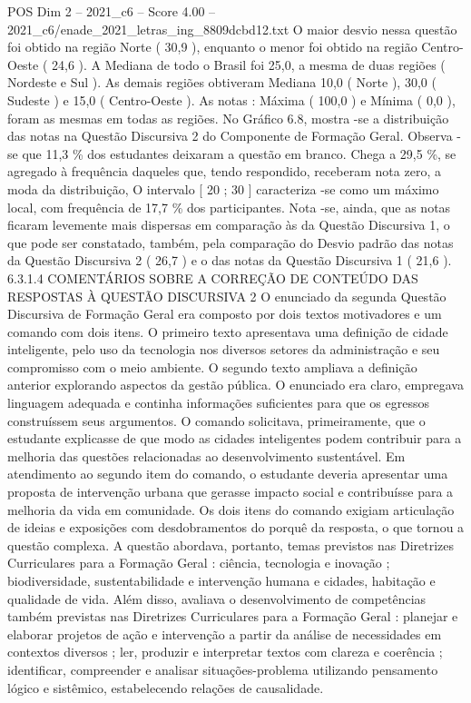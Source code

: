 \begin{textsample}{POS Dim 2 – 2021\_c6 – Score 4.00 – 2021\_c6/enade\_2021\_letras\_ing\_8809dcbd12.txt}
O maior desvio nessa questão foi obtido na região Norte ( 30,9 ), enquanto o menor foi obtido na região Centro-Oeste ( 24,6 ).
A Mediana de todo o Brasil foi 25,0, a mesma de duas regiões ( Nordeste e Sul ).
As demais regiões obtiveram Mediana 10,0 ( Norte ), 30,0 ( Sudeste ) e 15,0 ( Centro-Oeste ).
As notas : Máxima ( 100,0 ) e Mínima ( 0,0 ), foram as mesmas em todas as regiões.
No Gráfico 6.8, mostra -se a distribuição das notas na Questão Discursiva 2 do Componente de Formação Geral.
Observa -se que 11,3 \% dos estudantes deixaram a questão em branco.
Chega a 29,5 \%, se agregado à frequência daqueles que, tendo respondido, receberam nota zero, a moda da distribuição, O intervalo [ 20 ; 30 ] caracteriza -se como um máximo local, com frequência de 17,7 \% dos participantes.
Nota -se, ainda, que as notas ficaram levemente mais dispersas em comparação às da Questão Discursiva 1, o que pode ser constatado, também, pela comparação do Desvio padrão das notas da Questão Discursiva 2 ( 26,7 ) e o das notas da Questão Discursiva 1 ( 21,6 ). 6.3.1.4 COMENTÁRIOS SOBRE A CORREÇÃO DE CONTEÚDO DAS RESPOSTAS À QUESTÃO DISCURSIVA 2 O enunciado da segunda Questão Discursiva de Formação Geral era composto por dois textos motivadores e um comando com dois itens.
O primeiro texto apresentava uma definição de cidade inteligente, pelo uso da tecnologia nos diversos setores da administração e seu compromisso com o meio ambiente.
O segundo texto ampliava a definição anterior explorando aspectos da gestão pública.
O enunciado era claro, empregava linguagem adequada e continha informações suficientes para que os egressos construíssem seus argumentos.
O comando solicitava, primeiramente, que o estudante explicasse de que modo as cidades inteligentes podem contribuir para a melhoria das questões relacionadas ao desenvolvimento sustentável.
Em atendimento ao segundo item do comando, o estudante deveria apresentar uma proposta de intervenção urbana que gerasse impacto social e contribuísse para a melhoria da vida em comunidade.
Os dois itens do comando exigiam articulação de ideias e exposições com desdobramentos do porquê da resposta, o que tornou a questão complexa.
A questão abordava, portanto, temas previstos nas Diretrizes Curriculares para a Formação Geral : ciência, tecnologia e inovação ; biodiversidade, sustentabilidade e intervenção humana e cidades, habitação e qualidade de vida.
Além disso, avaliava o desenvolvimento de competências também previstas nas Diretrizes Curriculares para a Formação Geral : planejar e elaborar projetos de ação e intervenção a partir da análise de necessidades em contextos diversos ; ler, produzir e interpretar textos com clareza e coerência ; identificar, compreender e analisar situações-problema utilizando pensamento lógico e sistêmico, estabelecendo relações de causalidade.

\end{textsample}
